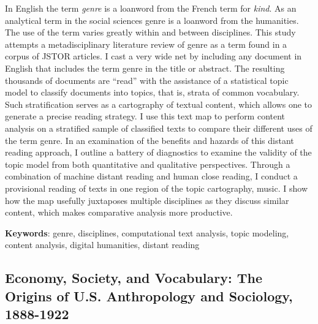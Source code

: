 \documentclass[]{book}
\theoremstyle{definition}
\theoremstyle{definition}
\theoremstyle{definition}
\theoremstyle{remark}
\begin{document}
In English the term \emph{genre} is a loanword from the
French term for \emph{kind}. As an analytical term in the social
sciences genre is a loanword from the humanities. The use of the term
varies greatly within and between disciplines. This study attempts a
metadisciplinary literature review of genre as a term found in a corpus
of JSTOR articles. I cast a very wide net by including any document in
English that includes the term genre in the title or abstract. The
resulting thousands of documents are ``read'' with the assistance of a
statistical topic model to classify documents into topics, that is,
strata of common vocabulary. Such stratification serves as a cartography
of textual content, which allows one to generate a precise reading
strategy. I use this text map to perform content analysis on a
stratified sample of classified texts to compare their different uses of
the term genre. In an examination of the benefits and hazards of this
distant reading approach, I outline a battery of diagnostics to examine
the validity of the topic model from both quantitative and qualitative
perspectives. Through a combination of machine distant reading and human
close reading, I conduct a provisional reading of texts in one region of
the topic cartography, music. I show how the map usefully juxtaposes
multiple disciplines as they discuss similar content, which makes
comparative analysis more productive.




\textbf{Keywords}: genre, disciplines, computational text analysis, topic
modeling, content analysis, digital humanities, distant reading

\hypertarget{economy-society-and-vocabulary-the-origins-of-u.s.-anthropology-and-sociology-1888-1922}{%
\subsection*{Economy, Society, and Vocabulary: The Origins of U.S.
Anthropology and Sociology,
1888-1922}\label{economy-society-and-vocabulary-the-origins-of-u.s.-anthropology-and-sociology-1888-1922}}
\end{document}
